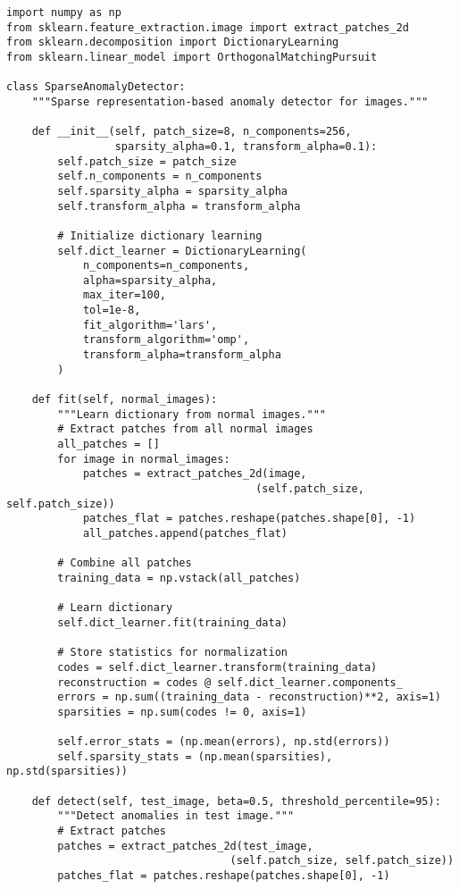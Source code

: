 \documentclass[12pt]{article}
\begin{document}
\begin{verbatim}
import numpy as np
from sklearn.feature_extraction.image import extract_patches_2d
from sklearn.decomposition import DictionaryLearning
from sklearn.linear_model import OrthogonalMatchingPursuit

class SparseAnomalyDetector:
    """Sparse representation-based anomaly detector for images."""
    
    def __init__(self, patch_size=8, n_components=256, 
                 sparsity_alpha=0.1, transform_alpha=0.1):
        self.patch_size = patch_size
        self.n_components = n_components
        self.sparsity_alpha = sparsity_alpha
        self.transform_alpha = transform_alpha
        
        # Initialize dictionary learning
        self.dict_learner = DictionaryLearning(
            n_components=n_components,
            alpha=sparsity_alpha,
            max_iter=100,
            tol=1e-8,
            fit_algorithm='lars',
            transform_algorithm='omp',
            transform_alpha=transform_alpha
        )
    
    def fit(self, normal_images):
        """Learn dictionary from normal images."""
        # Extract patches from all normal images
        all_patches = []
        for image in normal_images:
            patches = extract_patches_2d(image, 
                                       (self.patch_size, self.patch_size))
            patches_flat = patches.reshape(patches.shape[0], -1)
            all_patches.append(patches_flat)
        
        # Combine all patches
        training_data = np.vstack(all_patches)
        
        # Learn dictionary
        self.dict_learner.fit(training_data)
        
        # Store statistics for normalization
        codes = self.dict_learner.transform(training_data)
        reconstruction = codes @ self.dict_learner.components_
        errors = np.sum((training_data - reconstruction)**2, axis=1)
        sparsities = np.sum(codes != 0, axis=1)
        
        self.error_stats = (np.mean(errors), np.std(errors))
        self.sparsity_stats = (np.mean(sparsities), np.std(sparsities))
    
    def detect(self, test_image, beta=0.5, threshold_percentile=95):
        """Detect anomalies in test image."""
        # Extract patches
        patches = extract_patches_2d(test_image, 
                                   (self.patch_size, self.patch_size))
        patches_flat = patches.reshape(patches.shape[0], -1)
        

\end{verbatim}
\end{document}
